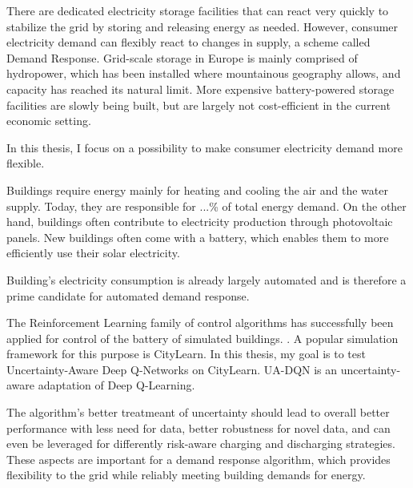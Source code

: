 There are dedicated electricity storage facilities that can react very quickly to stabilize the grid by storing and releasing energy as needed.
However, consumer electricity demand can flexibly react to changes in supply, a scheme called Demand Response.
Grid-scale storage in Europe is mainly comprised of hydropower, which has been installed where mountainous geography allows, and capacity has reached its natural limit.
More expensive battery-powered storage facilities are slowly being built, but are largely not cost-efficient in the current economic setting.

In this thesis, I focus on a possibility to make consumer electricity demand more flexible.

Buildings require energy mainly for heating and cooling the air and the water supply. Today, they are responsible for ...\% of total energy demand. On the other hand, buildings often contribute to electricity production through photovoltaic panels. New buildings often come with a battery, which enables them to more efficiently use their solar electricity.

Building's electricity consumption is already largely automated and is therefore a prime candidate for automated demand response.

The Reinforcement Learning family of control algorithms has successfully been applied for control of the battery of simulated buildings. . A popular simulation framework for this purpose is CityLearn.
In this thesis, my goal is to test Uncertainty-Aware Deep Q-Networks  on CityLearn. UA-DQN is an uncertainty-aware adaptation of Deep Q-Learning.

The algorithm's better treatmeant of uncertainty should lead to overall better performance with less need for data, better robustness for novel data, and can even be leveraged for differently risk-aware charging and discharging strategies.
These aspects are important for a demand response algorithm, which provides flexibility to the grid while reliably meeting building demands for energy. 

